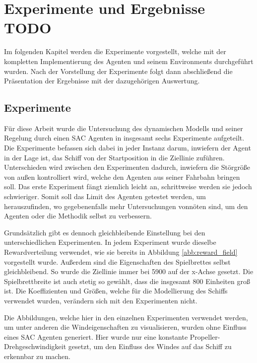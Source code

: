 \documentclass[]{iat}
\begin{document}
\chapter{Experimente und Ergebnisse TODO} \label{sec:ergebnisse}
Im folgenden Kapitel werden die Experimente vorgestellt, welche mit der kompletten Implementierung des Agenten und seinem Environments durchgeführt wurden. Nach der Vorstellung der Experimente folgt dann abschließend die Präsentation der Ergebnisse mit der dazugehörigen Auswertung.

\section{Experimente}
Für diese Arbeit wurde die Untersuchung des dynamischen Modells und seiner Regelung durch einen SAC Agenten in insgesamt sechs Experimente aufgeteilt. Die Experimente befassen sich dabei in jeder Instanz darum, inwiefern der Agent in der Lage ist, das Schiff von der Startposition in die Ziellinie zuführen. Unterschieden wird zwischen den Experimenten dadurch, inwiefern die Störgröße von außen kontrolliert wird, welche den Agenten aus seiner Fahrbahn bringen soll. Das erste Experiment fängt ziemlich leicht an, schrittweise werden sie jedoch schwieriger. Somit soll das Limit des Agenten getestet werden, um herauszufinden, wo gegebenenfalls mehr Untersuchungen vonnöten sind, um den Agenten oder die Methodik selbst zu verbessern.

Grundsätzlich gibt es dennoch gleichbleibende Einstellung bei den unterschiedlichen Experimenten. In jedem Experiment wurde dieselbe Rewardverteilung verwendet, wie sie bereits in Abbildung \ref{abb:reward_field} vorgestellt wurde. Außerdem sind die Eigenschaften des Spielbrettes selbst gleichbleibend. So wurde die Ziellinie immer bei 5900 auf der x-Achse gesetzt. Die Spielbrettbreite ist auch stetig so gewählt, dass die insgesamt 800 Einheiten groß ist. Die Koeffizienten und Größen, welche für die Modellierung des Schiffs verwendet wurden, verändern sich mit den Experimenten nicht.

Die Abbildungen, welche hier in den einzelnen Experimenten verwendet werden, um unter anderen die Windeigenschaften zu visualisieren, wurden ohne Einfluss eines SAC Agenten generiert. Hier wurde nur eine konstante Propeller-Drehgeschwindigkeit gesetzt, um den Einfluss des Windes auf das Schiff zu erkennbar zu machen.
\end{document}
